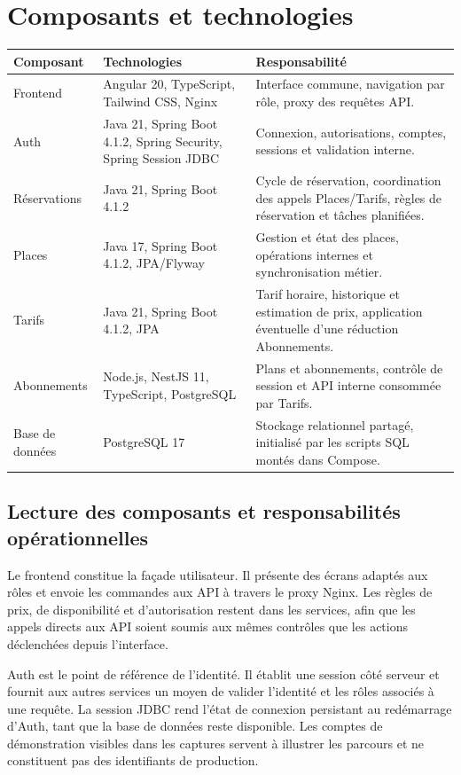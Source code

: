 \documentclass[11pt,a4paper]{report}
\begin{document}
\section{Composants et technologies}
\begin{longtable}{p{3cm}p{3.4cm}p{7.5cm}}
\toprule
\textbf{Composant} & \textbf{Technologies} & \textbf{Responsabilité} \\
\midrule
Frontend & Angular 20, TypeScript, Tailwind CSS, Nginx & Interface commune, navigation par rôle, proxy des requêtes API. \\
Auth & Java 21, Spring Boot 4.1.2, Spring Security, Spring Session JDBC & Connexion, autorisations, comptes, sessions et validation interne. \\
Réservations & Java 21, Spring Boot 4.1.2 & Cycle de réservation, coordination des appels Places/Tarifs, règles de réservation et tâches planifiées. \\
Places & Java 17, Spring Boot 4.1.2, JPA/Flyway & Gestion et état des places, opérations internes et synchronisation métier. \\
Tarifs & Java 21, Spring Boot 4.1.2, JPA & Tarif horaire, historique et estimation de prix, application éventuelle d'une réduction Abonnements. \\
Abonnements & Node.js, NestJS 11, TypeScript, PostgreSQL & Plans et abonnements, contrôle de session et API interne consommée par Tarifs. \\
Base de données & PostgreSQL 17 & Stockage relationnel partagé, initialisé par les scripts SQL montés dans Compose. \\
\bottomrule
\end{longtable}

\subsection{Lecture des composants et responsabilités opérationnelles}
Le frontend constitue la façade utilisateur. Il présente des écrans adaptés aux rôles et envoie les commandes aux API à travers le proxy Nginx. Les règles de prix, de disponibilité et d'autorisation restent dans les services, afin que les appels directs aux API soient soumis aux mêmes contrôles que les actions déclenchées depuis l'interface.

Auth est le point de référence de l'identité. Il établit une session côté serveur et fournit aux autres services un moyen de valider l'identité et les rôles associés à une requête. La session JDBC rend l'état de connexion persistant au redémarrage d'Auth, tant que la base de données reste disponible. Les comptes de démonstration visibles dans les captures servent à illustrer les parcours et ne constituent pas des identifiants de production.
\end{document}
